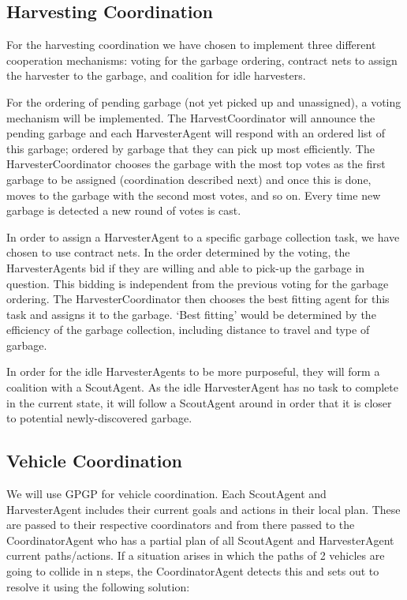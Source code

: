 \subsection{Harvesting Coordination}

For the harvesting coordination we have chosen to implement three different cooperation mechanisms: voting for the garbage ordering, contract nets to assign the harvester to the garbage, and coalition for idle harvesters. 

For the ordering of pending garbage (not yet picked up and unassigned), a voting mechanism will be implemented. The HarvestCoordinator will announce the pending garbage and each HarvesterAgent will respond with an ordered list of this garbage; ordered by garbage that they can pick up most efficiently. The HarvesterCoordinator chooses the garbage with the most top votes as the first garbage to be assigned (coordination described next) and once this is done, moves to the garbage with the second most votes, and so on. Every time new garbage is detected a new round of votes is cast.

In order to assign a HarvesterAgent to a specific garbage collection task, we have chosen to use contract nets. In the order determined by the voting, the HarvesterAgents bid if they are willing and able to pick-up the garbage in question. This bidding is independent from the previous voting for the garbage ordering. The HarvesterCoordinator then chooses the best fitting agent for this task and assigns it to the garbage. `Best fitting' would be determined by the efficiency of the garbage collection, including distance to travel and type of garbage. 

In order for the idle HarvesterAgents to be more purposeful, they will form a coalition with a ScoutAgent. As the idle HarvesterAgent has no task to complete in the current state, it will follow a ScoutAgent around in order that it is closer to potential newly-discovered garbage. 

\subsection{Vehicle Coordination}

We will use GPGP for vehicle coordination. Each ScoutAgent and HarvesterAgent includes their current goals and actions in their local plan. These are passed to their respective coordinators and from there passed to the CoordinatorAgent who has a partial plan of all ScoutAgent and HarvesterAgent current paths/actions. If a situation arises in which the paths of 2 vehicles are going to collide in n steps, the CoordinatorAgent detects this and sets out to resolve it using the following solution:

